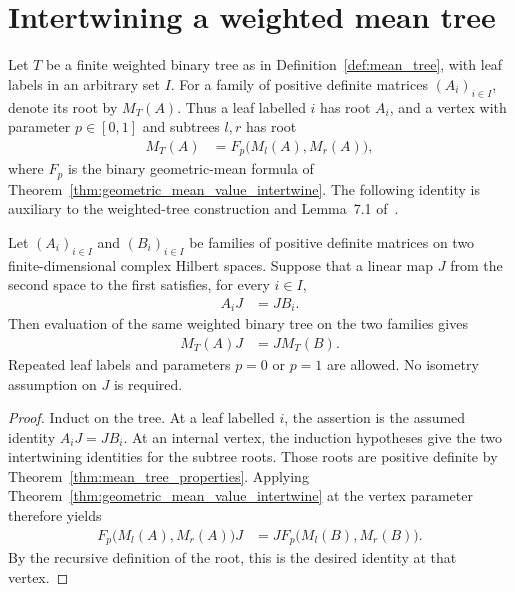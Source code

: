 \section{Intertwining a weighted mean tree}
\label{sec:mean_tree_intertwine}

Let $T$ be a finite weighted binary tree as in
Definition~\ref{def:mean_tree}, with leaf labels in an arbitrary set $I$.
For a family of positive definite matrices $(A_i)_{i\in I}$, denote its
root by $M_T(A)$. Thus a leaf labelled $i$ has root $A_i$, and a vertex
with parameter $p\in[0,1]$ and subtrees $l,r$ has root
\begin{align}
  M_T(A)&=F_p\bigl(M_l(A),M_r(A)\bigr),
\end{align}
where $F_p$ is the binary geometric-mean formula of
Theorem~\ref{thm:geometric_mean_value_intertwine}.
The following identity is auxiliary to the weighted-tree construction
and Lemma~7.1 of~\cite{OpenAI2026AreaLaw}.

\begin{theorem}
  \label{thm:mean_tree_intertwine}
  \leanok
  Let $(A_i)_{i\in I}$ and $(B_i)_{i\in I}$ be families of positive
  definite matrices on two finite-dimensional complex Hilbert spaces.
  Suppose that a linear map $J$ from the second space to the first satisfies,
  for every $i\in I$,
  \begin{align}
    A_iJ&=JB_i.
  \end{align}
  Then evaluation of the same weighted binary tree on the two families gives
  \begin{align}
    M_T(A)J&=JM_T(B).
  \end{align}
  Repeated leaf labels and parameters $p=0$ or $p=1$ are allowed.
  No isometry assumption on $J$ is required.
\end{theorem}

\begin{proof}
  \leanok
  Induct on the tree. At a leaf labelled $i$, the assertion is the
  assumed identity $A_iJ=JB_i$. At an internal vertex, the induction
  hypotheses give the two intertwining identities for the subtree roots.
  Those roots are positive definite by
  Theorem~\ref{thm:mean_tree_properties}. Applying
  Theorem~\ref{thm:geometric_mean_value_intertwine} at the vertex parameter
  therefore yields
  \begin{align}
    F_p\bigl(M_l(A),M_r(A)\bigr)J
      &=JF_p\bigl(M_l(B),M_r(B)\bigr).
  \end{align}
  By the recursive definition of the root, this is the desired identity
  at that vertex.
\end{proof}
